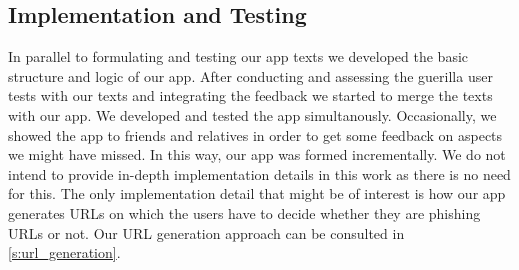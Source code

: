 \subsection{Implementation and Testing}
In parallel to formulating and testing our app texts we developed the basic structure and logic of our app.
After conducting and assessing the guerilla user tests with our texts and integrating the feedback we started to merge the texts with our app.
We developed and tested the app simultanously.
Occasionally, we showed the app to friends and relatives in order to get some feedback on aspects we might have missed.
In this way, our app was formed incrementally. 
We do not intend to provide in-depth implementation details in this work as there is no need for this.
The only implementation detail that might be of interest is how our app generates URLs on which the users have to decide whether they are phishing URLs or not. 
Our URL generation approach can be consulted in \autoref{s:url_generation}.
